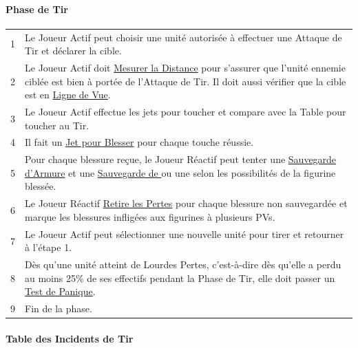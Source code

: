 {\newpage

\begin{minipage}[t]{.68\linewidth}

\paragraph{Phase de Tir}

\begin{tabular}{c|p{11cm}}
1 & Le Joueur Actif peut choisir une unité autorisée à effectuer une Attaque de Tir et déclarer la cible. \tabularnewline
2 & Le Joueur Actif doit \hyperlink{measuringdistances}{Mesurer la Distance} pour s'assurer que l'unité ennemie ciblée est bien à portée de l'Attaque de Tir. Il doit aussi vérifier que la cible est en \hyperlink{lineofsight}{Ligne de Vue}. \tabularnewline
3 & Le Joueur Actif effectue les jets pour toucher et compare avec la Table pour toucher au Tir. \tabularnewline
4 & Il fait un \hyperlink{towoundroll}{Jet pour Blesser} pour chaque touche réussie. \tabularnewline
5 & Pour chaque blessure reçue, le Joueur Réactif peut tenter une \hyperlink{armoursaveandmodifiers}{Sauvegarde d'Armure} et une \hyperlink{regeneration}{Sauvegarde de \regeneration{}} ou une \hyperlink{wardsave}{\wardsave{}} selon les possibilités de la figurine blessée. \tabularnewline
6 & Le Joueur Réactif \hyperlink{removecasualties}{Retire les Pertes} pour chaque blessure non sauvegardée et marque les blessures infligées aux figurines à plusieurs PVs. \tabularnewline
7 & Le Joueur Actif peut sélectionner une nouvelle unité pour tirer et retourner à l'étape 1. \tabularnewline
8 & Dès qu'une unité atteint de Lourdes Pertes, c'est-à-dire dès qu'elle a perdu au moins 25\% de ses effectifs pendant la Phase de Tir, elle doit passer un \hyperlink{panictest}{Test de Panique}. \tabularnewline
9 & Fin de la phase. \tabularnewline
\end{tabular}

\vspace*{10pt}
\paragraph{Table des Incidents de Tir}


\end{minipage}}
